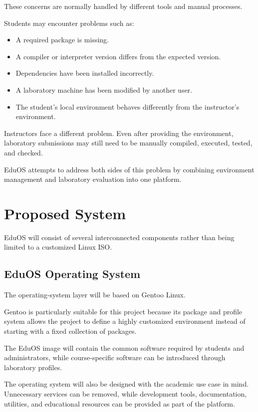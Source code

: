 \documentclass[12pt,a4paper]{article}
\begin{document}
These concerns are normally handled by different tools and manual processes.

Students may encounter problems such as:

\begin{itemize}
    \item A required package is missing.
    \item A compiler or interpreter version differs from the expected version.
    \item Dependencies have been installed incorrectly.
    \item A laboratory machine has been modified by another user.
    \item The student's local environment behaves differently from the instructor's environment.
\end{itemize}

Instructors face a different problem. Even after providing the environment, laboratory submissions may still need to be manually compiled, executed, tested, and checked.

EduOS attempts to address both sides of this problem by combining environment management and laboratory evaluation into one platform.

\section{Proposed System}

EduOS will consist of several interconnected components rather than being limited to a customized Linux ISO.

\subsection{EduOS Operating System}

The operating-system layer will be based on Gentoo Linux.

Gentoo is particularly suitable for this project because its package and profile system allows the project to define a highly customized environment instead of starting with a fixed collection of packages.

The EduOS image will contain the common software required by students and administrators, while course-specific software can be introduced through laboratory profiles.

The operating system will also be designed with the academic use case in mind. Unnecessary services can be removed, while development tools, documentation, utilities, and educational resources can be provided as part of the platform.
\end{document}
